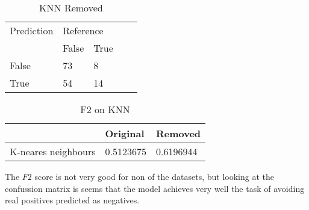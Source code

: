 \begin{table}[!htbp]
\centering
\caption{KNN Removed}
\vspace{0.1cm}
\label{knn-remov}
\begin{tabular}{|l|ll|ll}
\cline{1-3}
Prediction & \multicolumn{2}{l|}{Reference} &  &  \\
           & False          & True          &  &  \\ \cline{2-3}
False      & 73              & 8             &  &  \\
True       & 54              & 14             &  &  \\ \cline{1-3}
\end{tabular}
\end{table}

\begin{table}[!htbp]
\centering
\caption{F2 on KNN}
\vspace{0.1cm}
\label{knn-f2}
\begin{tabular}{|l|l|l|}
\hline
      & Original & Removed \\ \hline
K-neares neighbours & 0.5123675 & 0.6196944          \\ \hline
\end{tabular}
\end{table}


The $F2$ score is not very good for non of the datasets, but looking at the confussion matrix is seems that the model achieves very well the task of avoiding real positives predicted as negatives.



